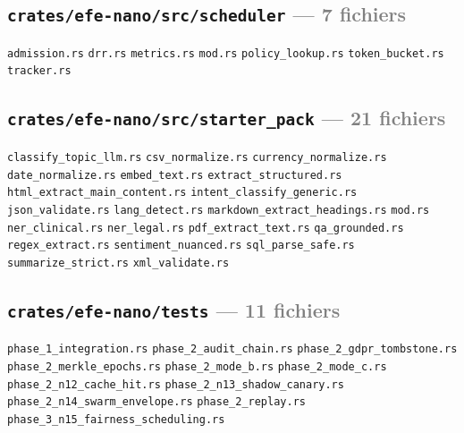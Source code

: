 \documentclass[10pt]{report}
\newcommand{\code}[1]{\texttt{\small #1}}
\begin{document}
\subsection*{\code{crates/efe-nano/src/scheduler} \normalfont\textcolor{grey}{--- 7 fichiers}}
\begin{sloppypar}\footnotesize\raggedright
\code{admission.rs} \;\textbullet\; \code{drr.rs} \;\textbullet\; \code{metrics.rs} \;\textbullet\; \code{mod.rs} \;\textbullet\; \code{policy\_lookup.rs} \;\textbullet\; \code{token\_bucket.rs} \;\textbullet\; \code{tracker.rs}
\end{sloppypar}

\subsection*{\code{crates/efe-nano/src/starter\_pack} \normalfont\textcolor{grey}{--- 21 fichiers}}
\begin{sloppypar}\footnotesize\raggedright
\code{classify\_topic\_llm.rs} \;\textbullet\; \code{csv\_normalize.rs} \;\textbullet\; \code{currency\_normalize.rs} \;\textbullet\; \code{date\_normalize.rs} \;\textbullet\; \code{embed\_text.rs} \;\textbullet\; \code{extract\_structured.rs} \;\textbullet\; \code{html\_extract\_main\_content.rs} \;\textbullet\; \code{intent\_classify\_generic.rs} \;\textbullet\; \code{json\_validate.rs} \;\textbullet\; \code{lang\_detect.rs} \;\textbullet\; \code{markdown\_extract\_headings.rs} \;\textbullet\; \code{mod.rs} \;\textbullet\; \code{ner\_clinical.rs} \;\textbullet\; \code{ner\_legal.rs} \;\textbullet\; \code{pdf\_extract\_text.rs} \;\textbullet\; \code{qa\_grounded.rs} \;\textbullet\; \code{regex\_extract.rs} \;\textbullet\; \code{sentiment\_nuanced.rs} \;\textbullet\; \code{sql\_parse\_safe.rs} \;\textbullet\; \code{summarize\_strict.rs} \;\textbullet\; \code{xml\_validate.rs}
\end{sloppypar}

\subsection*{\code{crates/efe-nano/tests} \normalfont\textcolor{grey}{--- 11 fichiers}}
\begin{sloppypar}\footnotesize\raggedright
\code{phase\_1\_integration.rs} \;\textbullet\; \code{phase\_2\_audit\_chain.rs} \;\textbullet\; \code{phase\_2\_gdpr\_tombstone.rs} \;\textbullet\; \code{phase\_2\_merkle\_epochs.rs} \;\textbullet\; \code{phase\_2\_mode\_b.rs} \;\textbullet\; \code{phase\_2\_mode\_c.rs} \;\textbullet\; \code{phase\_2\_n12\_cache\_hit.rs} \;\textbullet\; \code{phase\_2\_n13\_shadow\_canary.rs} \;\textbullet\; \code{phase\_2\_n14\_swarm\_envelope.rs} \;\textbullet\; \code{phase\_2\_replay.rs} \;\textbullet\; \code{phase\_3\_n15\_fairness\_scheduling.rs}
\end{sloppypar}
\end{document}

